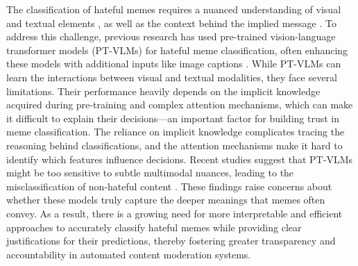 The classification of hateful memes requires a nuanced understanding of visual and textual elements \cite{kiela2021hateful}, as well as the context behind the implied message \cite{hee2023decoding}. To address this challenge, previous research has used pre-trained vision-language transformer models (PT-VLMs) \cite{lu2019vilbert,li2019visualbert} for hateful meme classification, often enhancing these models with additional inputs like image captions \cite{velioglu2020detecting, zhu2020enhance}. While PT-VLMs can learn the interactions between visual and textual modalities, they face several limitations. Their performance heavily depends on the implicit knowledge acquired during pre-training and complex attention mechanisms, which can make it difficult to explain their decisions—an important factor for building trust in meme classification. The reliance on implicit knowledge complicates tracing the reasoning behind classifications, and the attention mechanisms make it hard to identify which features influence decisions.  Recent studies suggest that PT-VLMs might be too sensitive to subtle multimodal nuances, leading to the misclassification of non-hateful content \cite{cuo2022understanding, hee2022explaining}. These findings raise concerns about whether these models truly capture the deeper meanings that memes often convey. As a result, there is a growing need for more interpretable and efficient approaches to accurately classify hateful memes while providing clear justifications for their predictions, thereby fostering greater transparency and accountability in automated content moderation systems.

